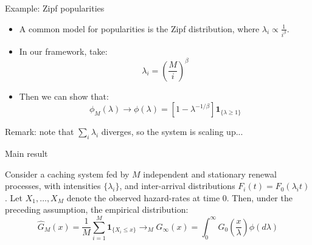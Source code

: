 \documentclass[aspectratio=169]{beamer}
\newcommand{\ind}[1]{\mathbf{1}_{#1}}
\newenvironment*{myitem}[1][1.5em]{\begin{itemize}\setlength{\itemsep}{#1}}{\end{itemize}}
\begin{document}
\begin{frame}{Example: Zipf popularities}
	
	\begin{myitem}
		\item A common model for popularities is the \alert{Zipf} distribution, where $\lambda_i \propto \frac{1}{i^\beta}$.
		\item In our framework, take:
			\begin{equation*}
				\lambda_i = \left(\frac{M}{i}\right)^\beta
			\end{equation*}
		\item Then we can show that:
		    \begin{equation*}
				\phi_M(\lambda) \to \phi(\lambda) = \left[1-\lambda^{-1/\beta}\right]\ind{\{\lambda\geqslant1\}}
			\end{equation*}
	\end{myitem}

	\vfill

	\alert{Remark:} note that $\sum_i \lambda_i$ diverges, so the system is scaling up...
\end{frame}
\begin{frame}{Main result}

	\begin{theorem}
		Consider a caching system fed by $M$ independent and stationary renewal processes, with intensities $\{\lambda_i\}$, and inter-arrival distributions $F_i(t)=F_0(\lambda_i t)$. Let $X_1,\ldots,X_M$ denote the observed hazard-rates at time $0$. Then, under the preceding assumption, the empirical distribution:
		\begin{equation*}
			\hat{G}_M(x) = \frac{1}{M}\sum_{i=1}^M \ind{\{X_i\leqslant x\}} \to_M G_\infty(x) = \int_0^\infty G_0\left(\frac{x}{\lambda}\right) \phi(d\lambda)
		\end{equation*}
	\end{theorem}

\end{frame}
\end{document}
